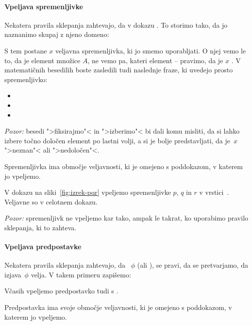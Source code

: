 \paragraph*{Vpeljava spremenljivke}
%
Nekatera pravila sklepanja zahtevajo, da v dokazu . To storimo tako, da jo naznanimo skupaj z njeno domeno:
%
\begin{quote}
\end{quote}
%
S tem postane $x$ veljavna spremenljivka, ki jo smemo uporabljati.
%
O njej vemo le to, da je element množice $A$, ne vemo pa, kateri element -- pravimo, da je $x$ . V matematičnih besedilih boste zasledili tudi naslednje fraze, ki uvedejo prosto spremenljivko:
%
\begin{itemize}
\item {}
\item {}
\item {}
\end{itemize}
%
\emph{Pozor:} besedi ">fiksirajmo"< in ">izberimo"< bi dali komu misliti, da si lahko izbere točno določen element po lastni volji, a si je bolje predstavljati, da je~$x$ ">neznan"< ali ">nedoločen"<.

Spremenljivka ima območje veljavnosti, ki je omejeno s poddokazom, v katerem jo vpeljemo.

\begin{zgled}
  V dokazu na sliki~\ref{fig:izrek-pqr} vpeljemo spremenljivke $p$, $q$ in $r$ v vrstici~. Veljavne so v celotnem dokazu.
\end{zgled}

\emph{Pozor:} spremenljivk ne vpeljemo kar tako, ampak le takrat, ko uporabimo pravilo sklepanja, ki to zahteva.


\paragraph*{Vpeljava predpostavke}
\label{sec:vpelj-predp}

Nekatera pravila sklepanja zahtevajo, da ~$\phi$ (ali ), se pravi, da se pretvarjamo, da izjava~$\phi$ velja. V takem primeru zapišemo:
%
\begin{quote}
\end{quote}
%
Včasih vpeljemo predpostavko tudi s .

Predpostavka ima svoje območje veljavnosti, ki je omejeno s poddokazom, v katerem jo vpeljemo.

